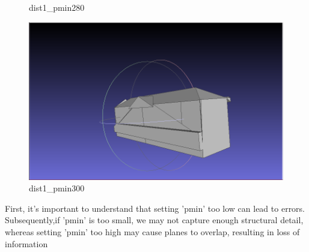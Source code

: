 \documentclass{article}
\begin{document}
\begin{itemize}
\begin{figure}[H]
\begin{minipage}[b]{0.45\textwidth}
      \caption{dist1\_pmin280}
      \label{fig:dist1_pmin280}
    \end{minipage}
    \hfill
    \begin{minipage}[b]{0.45\textwidth}

        \includegraphics[width=\textwidth]{../../images/screen_kinetic/dist1_pmin300.png}
        \caption{dist1\_pmin300}
        \label{fig:dist1_pmin300}
      \end{minipage}
  \end{figure}
  
  First, it's important to understand that setting 'pmin' too low can lead to errors. Subsequently,if 'pmin' is too small, we may not capture enough structural detail,
  whereas setting 'pmin' too high may cause planes to overlap, resulting in loss of information




\end{itemize}
\end{document}

